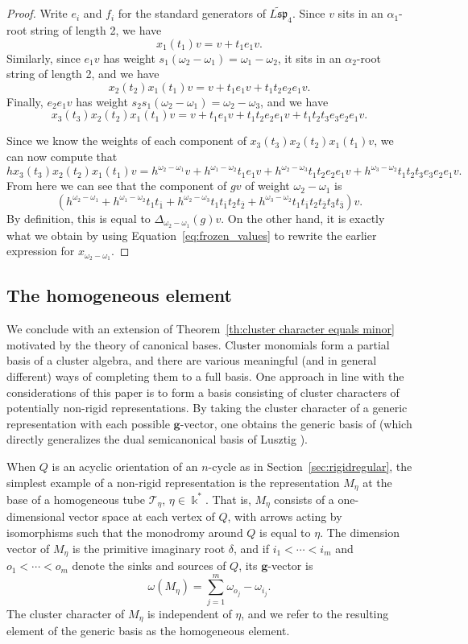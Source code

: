 \documentclass[12pt]{amsart}
\newcommand{\kk}{\Bbbk}
\newcommand{\bfg}{\mathbf{g}}
\newcommand{\gv}{\omega}
\newcommand{\grep}{\gv}
\newcommand{\ol}[1]{\overline{#1}}
\newcommand{\Qrep}{M}
\theoremstyle{remark}
\numberwithin{equation}{section}
\numberwithin{figure}{section}
\begin{document}
\begin{proof}
  Write $e_i$ and $f_i$ for the standard generators of $\widetilde{L\mathfrak{sp}}_4$.
  Since $v$ sits in an $\alpha_1$-root string of length 2, we have
  \[
    x_1(t_1)v = v + t_1e_1v.
  \]
  Similarly, since $e_1v$ has weight $s_1(\omega_2 - \omega_1) = \omega_1 - \omega_2$, it sits in an $\alpha_2$-root string of length 2, and we have
  \[
    x_2(t_2)x_1(t_1)v = v + t_1e_1v + t_1t_2e_2e_1v.
  \]
  Finally, $e_2e_1v$ has weight $s_2s_1(\omega_2 - \omega_1) = \omega_2 - \omega_3$, and we have
  \[
    x_3(t_3)x_2(t_2)x_1(t_1)v = v + t_1e_1v + t_1t_2e_2e_1v + t_1t_2t_3e_3e_2e_1v.
  \]

  Since we know the weights of each component of $x_3(t_3)x_2(t_2)x_1(t_1)v$, we can now compute that
  \[
    hx_3(t_3)x_2(t_2)x_1(t_1)v = h^{\omega_2-\omega_1}v + h^{\omega_1 - \omega_2}t_1e_1v + h^{\omega_2-\omega_3}t_1t_2e_2e_1v + h^{\omega_3-\omega_2}t_1t_2t_3e_3e_2e_1v.
  \]
  From here we can see that the component of $gv$ of weight $\omega_2 - \omega_1$ is
  \[
    (h^{\omega_2-\omega_1} + h^{\omega_1 - \omega_2}t_1t_{\ol{1}} + h^{\omega_2-\omega_3}t_1t_{\ol{1}}t_2t_{\ol{2}} + h^{\omega_3-\omega_2}t_1t_{\ol{1}}t_2t_{\ol{2}}t_3t_{\ol{3}})v.
  \]
  By definition, this is equal to $\Delta_{\omega_2-\omega_1}(g)v$.
  On the other hand, it is exactly what we obtain by using Equation~\eqref{eq:frozen_values} to rewrite the earlier expression for $x_{\omega_2 - \omega_1}$.
\end{proof}

\subsection{The homogeneous element}
We conclude with an extension of Theorem~\ref{th:cluster character equals minor} motivated by the theory of canonical bases.
Cluster monomials form a partial basis of a cluster algebra, and there are various meaningful (and in general different) ways of completing them to a full basis.
One approach in line with the considerations of this paper is to form a basis consisting of cluster characters of potentially non-rigid representations.
By taking the cluster character of a generic representation with each possible $\bfg$-vector, one obtains the generic basis of \cite{Dup12} (which directly generalizes the dual semicanonical basis of Lusztig \cite{Lus00}).

When $Q$ is an acyclic orientation of an $n$-cycle as in Section~\ref{sec:rigidregular}, the simplest example of a non-rigid representation is the representation $\Qrep_\eta$ at the base of a homogeneous tube $\mathcal{T}_\eta$, $\eta \in \kk^*$.
That is, $\Qrep_\eta$ consists of a one-dimensional vector space at each vertex of $Q$, with arrows acting by isomorphisms such that the monodromy around $Q$ is equal to $\eta$.
The dimension vector of $\Qrep_\eta$ is the primitive imaginary root $\delta$, and if $i_1<\cdots<i_m$ and $o_1<\cdots < o_m$ denote the sinks and sources of $Q$, its $\bfg$-vector is
\[
  \grep(\Qrep_\eta) = \sum_{j=1}^m \omega_{o_j} - \omega_{i_j}.
\]
The cluster character of $\Qrep_\eta$ is independent of $\eta$, and we refer to the resulting element of the generic basis as the homogeneous element.
\end{document}
